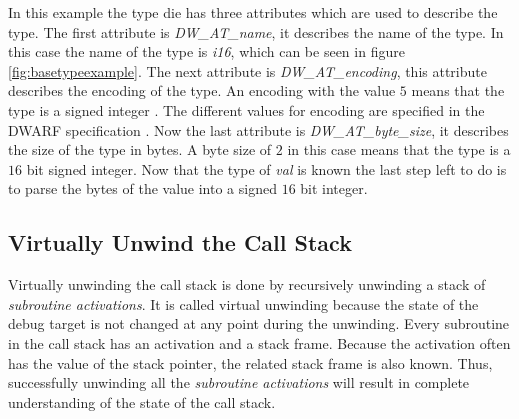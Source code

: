 In this example the type \gls{die} has three attributes which are used to describe the type.
The first attribute is \emph{DW\_AT\_name}, it describes the name of the type.
In this case the name of the type is \emph{i16}, which can be seen in figure \ref{fig:basetypeexample}.
The next attribute is \emph{DW\_AT\_encoding}, this attribute describes the encoding of the type.
An encoding with the value $5$ means that the type is a signed integer \cite{dwarf}.
The different values for encoding are specified in the \gls{DWARF} specification \cite{dwarf}.
Now the last attribute is \emph{DW\_AT\_byte\_size}, it describes the size of the type in bytes.
A byte size of $2$ in this case means that the type is a $16$ bit signed integer.
Now that the type of \emph{val} is known the last step left to do is to parse the bytes of the value into a signed $16$ bit integer.



\subsection{Virtually Unwind the Call Stack}
\label{sec:stacktrace}
 


Virtually unwinding the call stack is done by recursively unwinding a stack of \emph{subroutine activations}.
It is called virtual unwinding because the state of the debug target is not changed at any point during the unwinding.
Every subroutine in the call stack has an activation and a stack frame.
Because the activation often has the value of the stack pointer, the related stack frame is also known.
Thus, successfully unwinding all the \emph{subroutine activations} will result in complete understanding of the state of the call stack.


